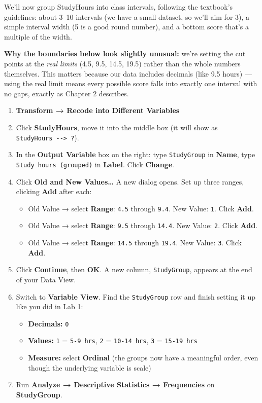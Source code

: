 \documentclass[
  11pt,
]{article}
\providecommand{\tightlist}{%
  \setlength{\itemsep}{0pt}\setlength{\parskip}{0pt}}\usepackage{longtable,booktabs,array}
\begin{document}
We'll now group StudyHours into class intervals, following the
textbook's guidelines: about 3--10 intervals (we have a small dataset,
so we'll aim for 3), a simple interval width (5 is a good round number),
and a bottom score that's a multiple of the width.

\textbf{Why the boundaries below look slightly unusual:} we're setting
the cut points at the \emph{real limits} (4.5, 9.5, 14.5, 19.5) rather
than the whole numbers themselves. This matters because our data
includes decimals (like 9.5 hours) --- using the real limit means every
possible score falls into exactly one interval with no gaps, exactly as
Chapter 2 describes.

\begin{enumerate}
\def\labelenumi{\arabic{enumi}.}
\tightlist
\item
  \textbf{Transform → Recode into Different Variables}
\item
  Click \textbf{StudyHours}, move it into the middle box (it will show
  as \texttt{StudyHours\ -\/-\textgreater{}\ ?}).
\item
  In the \textbf{Output Variable} box on the right: type
  \texttt{StudyGroup} in \textbf{Name}, type
  \texttt{Study\ hours\ (grouped)} in \textbf{Label}. Click
  \textbf{Change}.
\item
  Click \textbf{Old and New Values\ldots{}} A new dialog opens. Set up
  three ranges, clicking \textbf{Add} after each:

  \begin{itemize}
  \tightlist
  \item
    Old Value → select \textbf{Range}: \texttt{4.5} through
    \texttt{9.4}. New Value: \texttt{1}. Click \textbf{Add}.
  \item
    Old Value → select \textbf{Range}: \texttt{9.5} through
    \texttt{14.4}. New Value: \texttt{2}. Click \textbf{Add}.
  \item
    Old Value → select \textbf{Range}: \texttt{14.5} through
    \texttt{19.4}. New Value: \texttt{3}. Click \textbf{Add}.
  \end{itemize}
\item
  Click \textbf{Continue}, then \textbf{OK}. A new column,
  \texttt{StudyGroup}, appears at the end of your Data View.
\item
  Switch to \textbf{Variable View}. Find the \texttt{StudyGroup} row and
  finish setting it up like you did in Lab 1:

  \begin{itemize}
  \tightlist
  \item
    \textbf{Decimals:} \texttt{0}
  \item
    \textbf{Values:} \texttt{1} = \texttt{5-9\ hrs}, \texttt{2} =
    \texttt{10-14\ hrs}, \texttt{3} = \texttt{15-19\ hrs}
  \item
    \textbf{Measure:} select \textbf{Ordinal} (the groups now have a
    meaningful order, even though the underlying variable is scale)
  \end{itemize}
\item
  Run \textbf{Analyze → Descriptive Statistics → Frequencies} on
  \textbf{StudyGroup}.
\end{enumerate}
\end{document}
